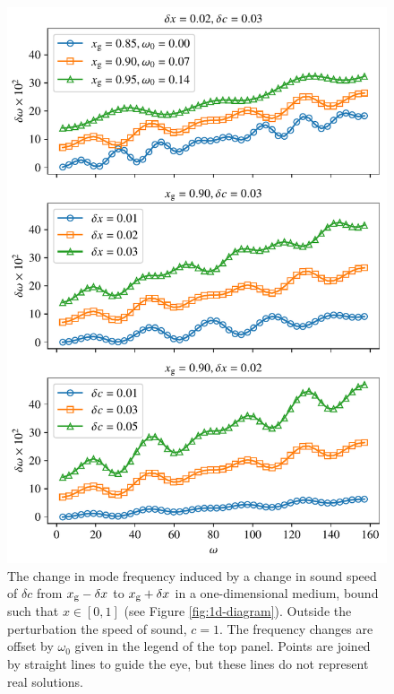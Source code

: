 \begin{figure}
    \centering
    \includegraphics{figures/glitch-1d-example-results.pdf}
    \caption[The change in mode frequency induced by a rapid change in sound speed for the 1D example.]{The change in mode frequency induced by a change in sound speed of \(\delta c\) from \(x_{{\mathrm{g}}} - \delta x\) to \(x_{{\mathrm{g}}} + \delta x\) in a one-dimensional medium, bound such that \(x \in [0, 1]\) (see Figure \ref{fig:1d-diagram}). Outside the perturbation the speed of sound, \(c=1\). The frequency changes are offset by \(\omega_0\) given in the legend of the top panel. Points are joined by straight lines to guide the eye, but these lines do not represent real solutions.
    }
    \label{fig:1d-results}
\end{figure}

